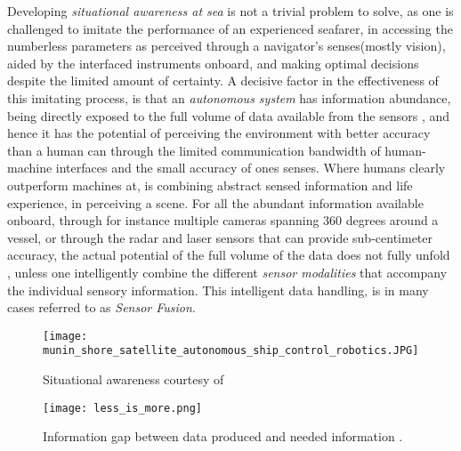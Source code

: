 Developing \emph{situational awareness at sea} is not a trivial problem to solve, as one is challenged to imitate the performance of an experienced seafarer, in accessing the numberless parameters as perceived through a navigator's senses(mostly vision), aided by the interfaced instruments onboard, and making optimal decisions despite the limited amount of certainty. A decisive factor in the effectiveness of this imitating process, is that  an \emph{autonomous system} has information abundance, being directly exposed to the full volume of data available from the sensors , and hence it has the potential of perceiving the environment with better accuracy than a human can through the limited communication bandwidth of human-machine interfaces and the small accuracy of ones senses. Where humans clearly outperform machines at, is combining abstract sensed information and life experience, in perceiving a scene. For all the abundant information available onboard, through for instance multiple cameras spanning 360 degrees around a vessel, or through the radar and laser sensors that can provide sub-centimeter accuracy, the actual potential of the full volume of the data does not  fully unfold , unless one intelligently combine the different \emph{sensor modalities} that accompany the individual sensory information. This intelligent data handling, is in many cases referred to as \emph{Sensor Fusion}.


\begin{figure}[H]
	\centering
	\texttt{[image: munin\_shore\_satellite\_autonomous\_ship\_control\_robotics.JPG]}
	\caption{Situational awareness courtesy of  \cite{MUNIN}}
	\label{fig:situation}
\end{figure}



\begin{figure}[H]
	\centering
	\texttt{[image: less\_is\_more.png]}
	\caption{Information gap between data produced and needed information  \cite{Endsley1995}.}
	\label{fig:less_is_more}
\end{figure}

